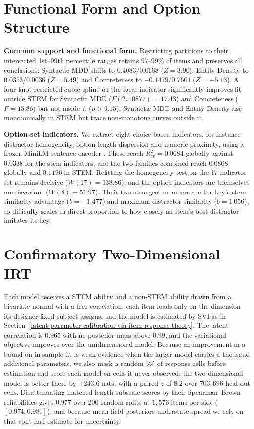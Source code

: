 \section{Functional Form and Option Structure}\label{sec:form}

\textbf{Common support and functional form.} Restricting partitions to their intersected 1st--99th percentile ranges retains 97--99\% of items and preserves all conclusions: Syntactic MDD shifts to $0.4083/0.0168$ ($Z = 3.90$), Entity Density to $0.0353/0.0036$ ($Z = 5.49$) and Concreteness to $-0.1479/0.7601$ ($Z = -5.13$). A four-knot restricted cubic spline \citep{harrell2015} on the focal indicator significantly improves fit outside STEM for Syntactic MDD ($F(2,10877) = 17.43$) and Concreteness ($F = 15.86$) but not inside it ($p > 0.15$): Syntactic MDD and Entity Density rise monotonically in STEM but trace non-monotone curves outside it.

\textbf{Option-set indicators.}\label{sec:options} We extract eight choice-based indicators, for instance distractor homogeneity, option length dispersion and numeric proximity, using a frozen MiniLM sentence encoder \citep{reimers2019}. These reach $R_{cv}^{2} = 0.0684$ globally against $0.0338$ for the stem indicators, and the two families combined reach $0.0808$ globally and $0.1196$ in STEM. Refitting the homogeneity test on the 17-indicator set remains decisive ($W(17) = 138.86$), and the option indicators are themselves non-invariant ($W(8) = 51.97$). Their two strongest members are the key's stem-similarity advantage ($b = -1.477$) and maximum distractor similarity ($b = 1.056$), so difficulty scales in direct proportion to how closely an item's best distractor imitates its key.

\section{Confirmatory Two-Dimensional IRT}\label{sec:mirt}

Each model receives a STEM ability and a non-STEM ability drawn from a bivariate normal with a free correlation, each item loads only on the dimension its designer-fixed subject assigns, and the model is estimated by SVI as in Section~\ref{latent-parameter-calibration-via-item-response-theory}. The latent correlation is $0.965$ with no posterior mass above $0.99$, and the variational objective improves over the unidimensional model. Because an improvement in a bound on in-sample fit is weak evidence when the larger model carries a thousand additional parameters, we also mask a random $5\%$ of response cells before estimation and score each model on cells it never observed: the two-dimensional model is better there by $+243.6$ nats, with a paired $z$ of $8.2$ over $703{,}696$ held-out cells. Disattenuating matched-length subscale scores by their Spearman--Brown reliabilities gives $0.977$ over 200 random splits at $1{,}576$ items per side ($[0.974,0.980]$), and because mean-field posteriors understate spread we rely on that split-half estimate for uncertainty.

